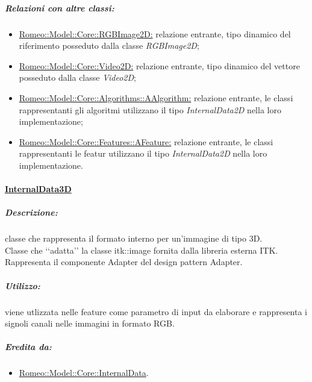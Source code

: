 			\subparagraph{Relazioni con altre classi:}
				\begin{itemize}
					\item \hyperref[]{Romeo::Model::Core::RGBImage2D:} relazione entrante, tipo dinamico del riferimento posseduto dalla classe \textsl{RGBImage2D};
					
					\item \hyperref[]{Romeo::Model::Core::Video2D:} relazione entrante, tipo dinamico del vettore posseduto dalla classe \textsl{Video2D};
					
					\item \hyperref[]{Romeo::Model::Core::Algorithms::AAlgorithm:} relazione entrante, le classi rappresentanti gli algoritmi utilizzano il tipo \textsl{InternalData2D} nella loro implementazione;
					
					\item \hyperref[]{Romeo::Model::Core::Features::AFeature:} relazione entrante, le classi rappresentanti le featur utilizzano il tipo \textsl{InternalData2D} nella loro implementazione.
				\end{itemize}


		\paragraph{\underline{InternalData3D}}
		\label{core_internal3d}
		\subparagraph{Descrizione:} classe che rappresenta il formato interno per un'immagine di tipo 3D.
		\\Classe che \lq\lq{}adatta\rq\rq{} la classe itk::image fornita dalla libreria esterna ITK\g{}.
		\\Rappresenta il componente Adapter del design pattern\g{} Adapter.
					
					\subparagraph{Utilizzo:} viene utlizzata nelle feature\g{} come parametro di input da elaborare e rappresenta i signoli canali nelle immagini in formato RGB.
					
					\subparagraph{Eredita da:}
						\begin{itemize}
							\item \hyperref[internaldata]{Romeo::Model::Core::InternalData}.
						\end{itemize}
						
